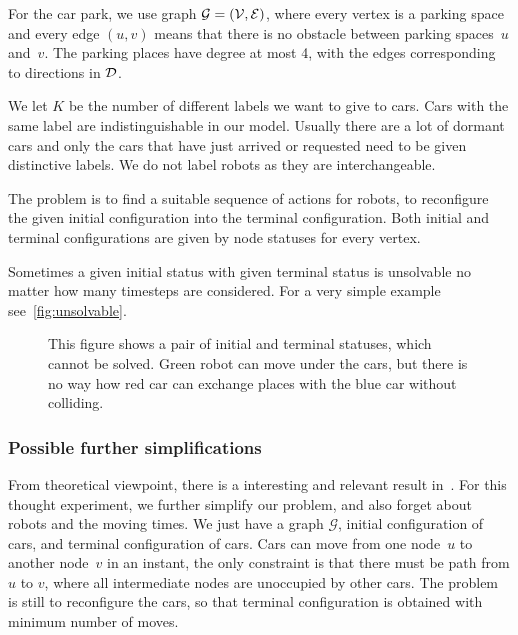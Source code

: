 For the car park, we use graph $\mathcal{G} = (\mathcal{V},\mathcal{E})$, where every vertex is a
parking space and every edge $(u,v)$ means that there is no obstacle between
parking spaces~$u$ and~$v$. The parking places have degree at most 4,
with the edges corresponding to directions in $\mathcal{D}$.

We let $K$ be the number of different labels we want to give to cars. Cars with
the same label are indistinguishable in our model. Usually there are a lot of
dormant cars and only the cars that have just arrived or requested need to be
given distinctive labels. We do not label robots as they are interchangeable.

The problem is to find a suitable sequence of actions for robots, to
reconfigure the given initial configuration into the terminal configuration.
Both initial and terminal configurations are given by node statuses for every
vertex.

Sometimes a given initial status with given terminal status is unsolvable no
matter how many timesteps are considered. For a very simple example
see~\autoref{fig:unsolvable}.

\begin{figure}[h]
    \begin{center}
        
        \caption{This figure shows a pair of initial and terminal statuses,
            which cannot be solved. Green robot can move under the cars, but there
            is no way how red car can exchange places with the blue car without
        colliding.}
        \label{fig:unsolvable}
    \end{center}
\end{figure}

\subsubsection{Possible further simplifications}
From theoretical viewpoint, there is a interesting and relevant result
in~\cite{calinescu2008reconfigurations}. For this thought experiment, we further
simplify our problem, and also forget about robots and the moving times. We
just have a graph $\mathcal{G}$, initial configuration of cars, and terminal
configuration of cars. Cars can move from one node~$u$ to another node~$v$ in
an instant, the only constraint is that there must be path from $u$ to $v$,
where all intermediate nodes are unoccupied by other cars. The problem is still
to reconfigure the cars, so that terminal configuration is obtained with
minimum number of moves. 

